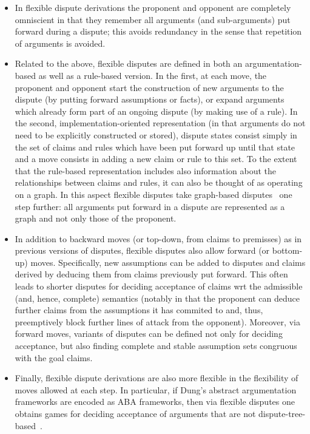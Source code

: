 \documentclass[conference]{IEEEtran}
\begin{document}
\begin{itemize}
\item In flexible dispute derivations the proponent and opponent are completely omniscient in that they remember all arguments (and sub-arguments) put forward during a dispute; this avoids redundancy in the sense that repetition of arguments is avoided.    
\item Related to the above, flexible disputes are defined in both an argumentation-based as well as a rule-based version.  In the first, at each move, the proponent and opponent start the construction of new arguments to the dispute (by putting forward assumptions or facts), or expand arguments which already form part of an ongoing dispute (by making use of a rule).  In the second, implementation-oriented representation (in that arguments do not need to be explicitly constructed or stored), dispute states consist simply in the set of claims and rules which have been put forward up until that state and a move consists in adding a new claim or rule to this set.   To the extent that the rule-based representation includes also information about the relationships between claims and rules, it can also be thought of as operating on a graph.  In this aspect flexible disputes take graph-based disputes~\cite{CravenT16} one step further: all arguments put forward in a dispute are represented as a graph and not only those of the proponent.
\item In addition to backward moves (or top-down, from claims to premisses) as in previous versions of disputes, flexible disputes also allow forward (or bottom-up) moves.  Specifically, new assumptions can be added to disputes and claims derived by deducing them from claims previously put forward.  This often leads to shorter disputes for deciding acceptance of claims wrt the admissible (and, hence, complete) semantics (notably in that the proponent can deduce further claims from the assumptions it has commited to and, thus, preemptively block further lines of attack from the opponent). Moreover, via forward moves, variants of disputes can be defined not only for deciding acceptance, but also finding complete and stable assumption sets congruous with the goal claims.
\item Finally, flexible dispute derivations are also more flexible in the flexibility of moves allowed at each step.  In particular, if Dung's abstract argumentation frameworks are encoded as ABA frameworks, then via flexible disputes one obtains games for deciding acceptance of arguments that are not dispute-tree-based~\cite{Caminada18}.
\end{itemize}
\end{document}
